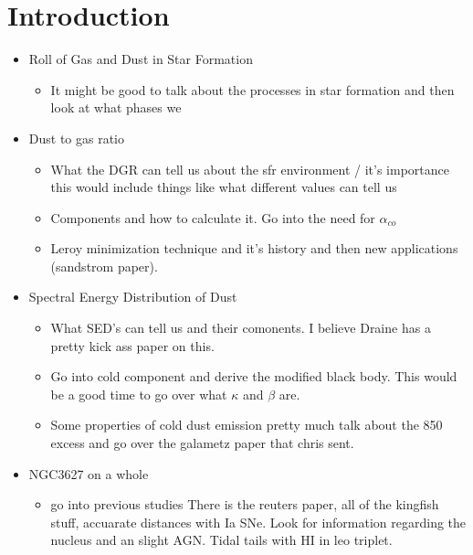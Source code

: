 \chapter{Introduction}\label{intro}

\begin{itemize}
  \item Roll of Gas and Dust in Star Formation
    \begin{itemize}
      \item It might be good to talk about the processes in star formation and then look at what phases we 
    \end{itemize}

  \item Dust to gas ratio
    \begin{itemize}
      \item What the DGR can tell us about the sfr environment / it's importance this would include things like what different values can tell us
      \item Components and how to calculate it.  Go into the need for $\alpha_{co}$
      \item Leroy minimization technique and it's history and then new applications (sandstrom paper).
    \end{itemize}

  \item Spectral Energy Distribution of Dust
    \begin{itemize}
      \item What SED's can tell us and their comonents.  I believe Draine has a pretty kick ass paper on this.
      \item Go into cold component and derive the modified black body.  This would be a good time to go over what $\kappa$ and $\beta$ are.
      \item Some properties of cold dust emission pretty much talk about the 850 excess and go over the galametz paper that chris sent.
    \end{itemize}

  \item NGC3627 on a whole
    \begin{itemize}
      \item go into previous studies  There is the reuters paper, all of the kingfish stuff, accuarate distances with Ia SNe.  Look for information regarding the nucleus and an slight AGN.  Tidal tails with HI in leo triplet.
    \end{itemize}
\end{itemize}
